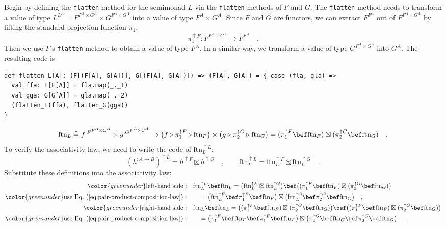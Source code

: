 Begin by defining the \lstinline!flatten! method for the semimonad
$L$ via the \lstinline!flatten! methods of $F$ and $G$. The \lstinline!flatten!
method needs to transform a value of type $L^{L^{A}}=F^{F^{A}\times G^{A}}\times G^{F^{A}\times G^{A}}$
into a value of type $F^{A}\times G^{A}$. Since $F$ and $G$ are
functors, we can extract $F^{F^{A}}$ out of $F^{F^{A}\times G^{A}}$
by lifting the standard projection function $\pi_{1}$,
\[
\pi_{1}^{\uparrow F}:F^{F^{A}\times G^{A}}\rightarrow F^{F^{A}}\quad.
\]
Then we use $F$\textsf{'}s \lstinline!flatten! method to obtain a value of
type $F^{A}$. In a similar way, we transform a value of type $G^{F^{A}\times G^{A}}$
into $G^{A}$. The resulting code is
\begin{lstlisting}
def flatten_L[A]: (F[(F[A], G[A])], G[(F[A], G[A])]) => (F[A], G[A]) = { case (fla, gla) =>
  val ffa: F[F[A]] = fla.map(_._1)
  val gga: G[G[A]] = gla.map(_._2)
  (flatten_F(ffa), flatten_G(gga))
}
\end{lstlisting}
\begin{equation}
\text{ftn}_{L}\triangleq f^{:F^{F^{A}\times G^{A}}}\times g^{:G^{F^{A}\times G^{A}}}\rightarrow\big(f\triangleright\pi_{1}^{\uparrow F}\triangleright\text{ftn}_{F}\big)\times\big(g\triangleright\pi_{2}^{\uparrow G}\triangleright\text{ftn}_{G}\big)=(\pi_{1}^{\uparrow F}\bef\text{ftn}_{F})\boxtimes(\pi_{2}^{\uparrow G}\bef\text{ftn}_{G})\quad.\label{eq:monad-product-flatten-def-ftn}
\end{equation}
To verify the associativity law, we need to write the code of $\text{ftn}_{L}^{\uparrow L}$:
\[
(h^{:A\rightarrow B})^{\uparrow L}=h^{\uparrow F}\boxtimes h^{\uparrow G}\quad,\quad\quad\text{ftn}_{L}^{\uparrow L}=\text{ftn}_{L}^{\uparrow F}\boxtimes\text{ftn}_{L}^{\uparrow G}\quad.
\]
Substitute these definitions into the associativity law:
\begin{align*}
{\color{greenunder}\text{left-hand side}:}\quad & \text{ftn}_{L}^{\uparrow L}\bef\text{ftn}_{L}=\big(\text{ftn}_{L}^{\uparrow F}\boxtimes\text{ftn}_{L}^{\uparrow G}\big)\bef\big((\pi_{1}^{\uparrow F}\bef\text{ftn}_{F})\boxtimes(\pi_{2}^{\uparrow G}\bef\text{ftn}_{G})\big)\\
{\color{greenunder}\text{use Eq.~(\ref{eq:pair-product-composition-law})}:}\quad & \quad=\big(\text{ftn}_{L}^{\uparrow F}\bef\pi_{1}^{\uparrow F}\bef\text{ftn}_{F}\big)\boxtimes\big(\text{ftn}_{L}^{\uparrow G}\bef\pi_{2}^{\uparrow G}\bef\text{ftn}_{G}\big)\quad,\\
{\color{greenunder}\text{right-hand side}:}\quad & \text{ftn}_{L}\bef\text{ftn}_{L}=\big((\pi_{1}^{\uparrow F}\bef\text{ftn}_{F})\boxtimes(\pi_{2}^{\uparrow G}\bef\text{ftn}_{G})\big)\bef\big((\pi_{1}^{\uparrow F}\bef\text{ftn}_{F})\boxtimes(\pi_{2}^{\uparrow G}\bef\text{ftn}_{G})\big)\\
{\color{greenunder}\text{use Eq.~(\ref{eq:pair-product-composition-law})}:}\quad & \quad=\big(\pi_{1}^{\uparrow F}\bef\text{ftn}_{F}\bef\pi_{1}^{\uparrow F}\bef\text{ftn}_{F}\big)\boxtimes\big(\pi_{2}^{\uparrow G}\bef\text{ftn}_{G}\bef\pi_{2}^{\uparrow G}\bef\text{ftn}_{G}\big)\quad.
\end{align*}
